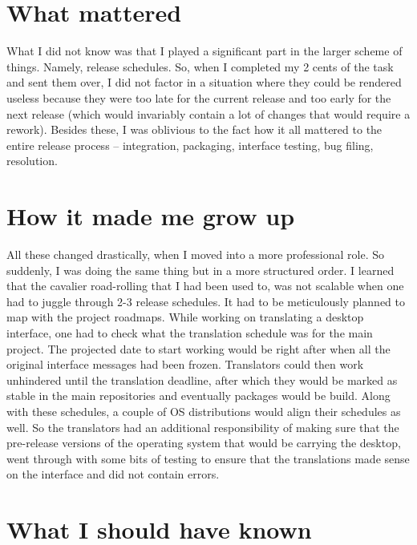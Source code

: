 \section*{What mattered}

What I did not know was that I played a significant part in the larger scheme of things. Namely, release schedules. So, when I completed my 2 cents of the task and sent them over, I did not factor in a situation where they could be rendered useless because they were too late for the current release and too early for the next release (which would invariably contain a lot of changes that would require a rework). Besides these, I was oblivious to the fact how it all mattered to the entire release process -- integration, packaging, interface testing, bug filing, resolution.

\section*{How it made me grow up}

All these changed drastically, when I moved into a more professional role. So suddenly, I was doing the same thing but in a more structured order. I learned that the cavalier road-rolling that I had been used to, was not scalable when one had to juggle through 2-3 release schedules. It had to be meticulously planned to map with the project roadmaps. While working on translating a desktop interface, one had to check what the translation schedule was for the main project. The projected date to start working would be right after when all the original interface messages had been frozen. Translators could then work unhindered until the translation deadline, after which they would be marked as stable in the main repositories and eventually packages would be build. Along with these schedules, a couple of OS distributions would align their schedules as well. So the translators had an additional responsibility of making sure that the pre-release versions of the operating system that would be carrying the desktop, went through with some bits of testing to ensure that the translations made sense on the interface and did not contain errors.

\section*{What I should have known}

